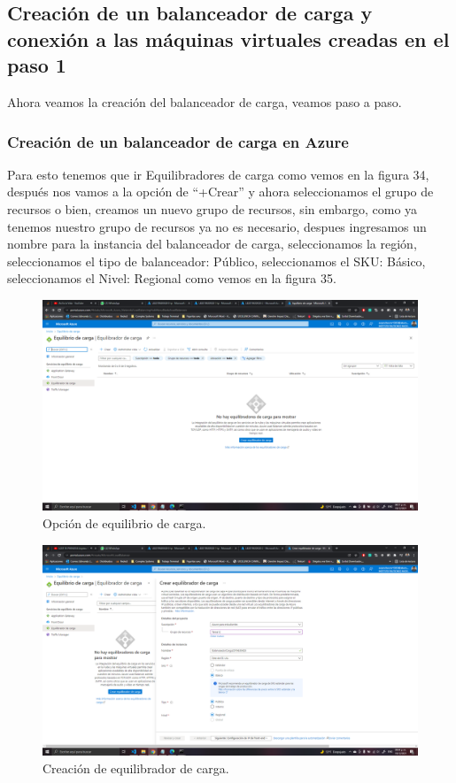 \documentclass[11pt]{article}
\begin{document}
		\subsection{Creación de un balanceador de carga y conexión a las máquinas virtuales creadas en el paso 1}
		Ahora veamos la creación del balanceador de carga, veamos paso a paso.
			\subsubsection{Creación de un balanceador de carga en Azure}
			Para esto tenemos que ir Equilibradores de carga como vemos en la figura 34, después nos vamos a la opción de ``+Crear'' y ahora seleccionamos el grupo de recursos o bien, creamos un nuevo grupo de recursos, sin embargo, como ya tenemos nuestro grupo de recursos ya no es necesario, despues ingresamos un nombre para la instancia del balanceador de carga, seleccionamos la región, seleccionamos el tipo de balanceador: Público, seleccionamos el SKU: Básico, seleccionamos el Nivel: Regional como vemos en la figura 35.
			\begin{figure}[H]
				\centering
				\includegraphics[scale=0.34]{resources/creacionBalanceador1-3.png}
				\caption{Opción de equilibrio de carga.}\label{fig:picture}
			\end{figure}
			\begin{figure}[H]
				\centering
				\includegraphics[scale=0.34]{resources/creacionBalanceador4-9.png}
				\caption{Creación de equilibrador de carga.}\label{fig:picture}
			\end{figure}
\end{document}
